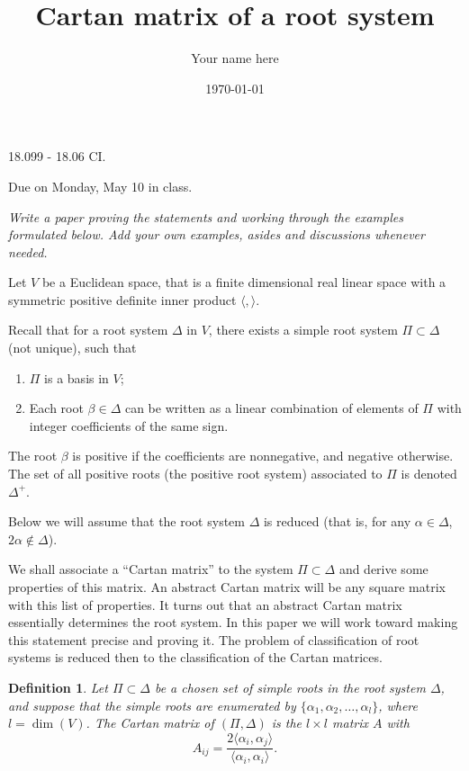 \documentclass[11pt]{amsart}
\newcommand{\la}{\langle}
\newcommand{\ra}{\rangle}
\newtheorem{definition}[theorem]{Definition}
\begin{document}
\title{Cartan matrix of a root system}
\author{Your name here}
\date{\today}
\maketitle


{\Large  18.099 - 18.06 CI.} 

{Due on Monday, May 10 in class.} 

\vspace{1cm} 

{\it Write a paper proving the statements and working through the examples 
formulated below. Add your own 
examples, asides and discussions whenever needed. }

Let $V$ be a Euclidean space, that is  
a finite dimensional real linear space with a symmetric 
positive definite inner product $\la, \ra$. 

Recall that for a root system $\Delta$ in  
$V$, there exists a simple root system 
$\Pi \subset \Delta$ (not unique), such that  \begin{enumerate}
\item{ $\Pi$ is a basis in $V$;}
\item{Each root $\beta \in \Delta$ can be written as a linear 
combination of elements of $\Pi$ with integer coefficients of the same sign.}
\end{enumerate} 
 The root $\beta$ is 
positive if the coefficients are nonnegative, and negative otherwise. 
The set of all positive roots (the positive root system) 
associated to $\Pi$ is denoted $\Delta^+$. 

Below we will assume that the root system $\Delta$ is reduced (that is, 
for any $\alpha \in \Delta$, $2\alpha \notin \Delta$). 

We shall associate a ``Cartan matrix'' to the system $\Pi \subset \Delta$ 
and derive some properties of this matrix. An abstract Cartan matrix will 
be any square matrix with this list of properties. 
It turns out that 
an abstract Cartan matrix essentially determines the root system. 
In this paper we will work toward making this 
statement precise and proving it. The problem of classification of 
root systems is reduced then to the classification of the Cartan matrices. 

\begin{definition} Let $\Pi \subset \Delta$ be a chosen set of simple roots 
in 
the root system $\Delta$, and suppose that the simple roots are enumerated 
by $\{ \alpha_1, \alpha_2, \ldots, \alpha_l \}$, where $l = \dim(V)$. 
The \emph{Cartan matrix} of $(\Pi, \Delta)$ is the $l\times l$ matrix $A$ with 
$$ A_{ij} = \frac{2\langle \alpha_i, \alpha_j \rangle}{\langle \alpha_i, 
\alpha_i \rangle}.$$ 
\end{definition}
\end{document}
